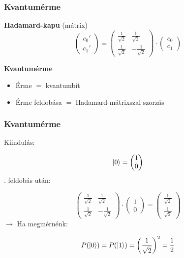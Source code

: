 \documentclass[aspectratio=169]{beamer}
\begin{document}
\begin{frame}
  \frametitle{Kvantumérme}

  \textbf{Hadamard-kapu} (mátrix)
  \[\begin{pmatrix} c_0' \\ c_1'
    \end{pmatrix} = \begin{pmatrix} \frac{1}{\sqrt{2}} & \frac{1}{\sqrt{2}}
      \\ \frac{1}{\sqrt{2}} & -\frac{1}{\sqrt{2}}\end{pmatrix} \cdot
    \begin{pmatrix} c_0 \\ c_1 \end{pmatrix}\]

  \pause
  \textbf{Kvantumérme}\\
  \begin{itemize}
    \item Érme $=$ kvantumbit
    \item Érme feldobása $=$ Hadamard-mátrixszal szorzás
  \end{itemize}
\end{frame}

\begin{frame}
  \frametitle{Kvantumérme}

  Kiindulás:

  \[\ket{0} = \begin{pmatrix} 1 \\ 0 \end{pmatrix}\]
  . feldobás után:

  \[\begin{pmatrix} \frac{1}{\sqrt{2}} & \frac{1}{\sqrt{2}}
      \\ \frac{1}{\sqrt{2}} & -\frac{1}{\sqrt{2}}\end{pmatrix} \cdot
    \begin{pmatrix} 1 \\ 0 \end{pmatrix} = \begin{pmatrix}
      \frac{1}{\sqrt{2}} \\ \frac{1}{\sqrt{2}}
    \end{pmatrix} \]
  \pause
  $\rightarrow$ Ha megmérnénk:

  \[P(\ket{0}) = P(\ket{1}) = \left(\frac{1}{\sqrt{2}} \right)^2 = \frac{1}{2}\]


\end{frame}
\end{document}

